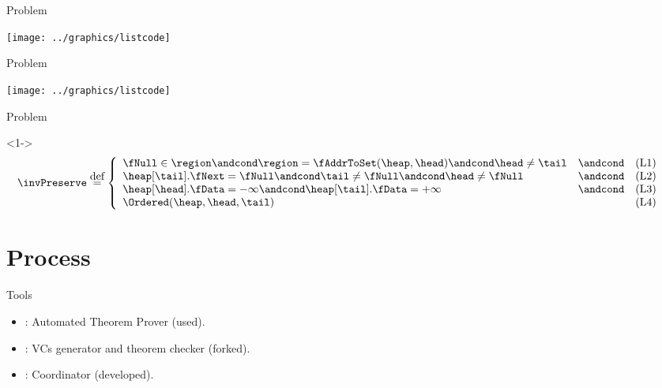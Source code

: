 \documentclass[10pt,notes,compress,usetitleprogressbar,aspectratio=1610]{beamer}
\renewcommand{\formulaFullListReducedBody}{
  \left\{
    \begin{array}{llc}
      \fNull \in \region \andcond
      \region = \fAddrToSet(\heap, \head) \andcond
      \head \neq \tail & \andcond & \text{(L1)} \\
      \heap[\tail].\fNext = \fNull \andcond
      \tail \neq \fNull \andcond
      \head \neq \fNull & \andcond & \text{(L2)} \\
      \heap[\head].\fData = -\infty \andcond
      \heap[\tail].\fData = +\infty & \andcond & \text{(L3)} \\
			\Ordered (\heap, \head, \tail) && \text{(L4)}
    \end{array}
  \right.
 }
\begin{document}
\begin{frame}{Problem}
\vspace{-0.5cm}
	\begin{center}
		\texttt{[image: ../graphics/listcode]}
	\end{center}
\end{frame}

\begin{frame}{Problem}
	\begin{center}
		\vspace{-7.7cm}\texttt{[image: ../graphics/listcode]}
	\end{center}
\end{frame}

\begin{frame}{Problem}
	
	\begin{block}<1->{}
		\begin{align}
			\invPreserve & \overset{\mbox{def}}{=} \formulaFullListReducedBody
			\label{inv:list}
		\end{align}
	\end{block}

\end{frame}

\section{Process}

\newcommand{\inputTikZ}[2]{%
     \scalebox{#1}{}  
}

\begin{frame}{Tools}
\begin{itemize}
	\item \spass: Automated Theorem Prover (used).
	\item \leap: VCs generator and theorem checker (forked).
	\item \gandalf: Coordinator (developed).
\end{itemize}
\end{frame}
\end{document}
